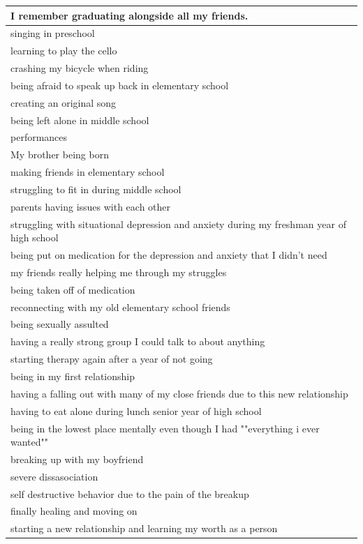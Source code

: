\documentclass[
  .7em,
  letterpaper,
  DIV=11,
  numbers=noendperiod]{scrartcl}
\begin{document}
\begin{table}
\begin{tabular}{l}
\hline
I remember graduating alongside all my friends.\\
\hline
singing in preschool\\
\hline
learning to play the cello\\
\hline
crashing my bicycle when riding\\
\hline
being afraid to speak up back in elementary school\\
\hline
creating an original song\\
\hline
being left alone in middle school\\
\hline
performances\\
\hline
My brother being born\\
\hline
making friends in elementary school\\
\hline
struggling to fit in during middle school\\
\hline
parents having issues with each other\\
\hline
struggling with situational depression and anxiety during my freshman year of high school\\
\hline
being put on medication for the depression and anxiety that I didn't need\\
\hline
my friends really helping me through my struggles\\
\hline
being taken off of medication\\
\hline
reconnecting with my old elementary school friends\\
\hline
being sexually assulted\\
\hline
having a really strong group I could talk to about anything\\
\hline
starting therapy again after a year of not going\\
\hline
being in my first relationship\\
\hline
having a falling out with many of my close friends due to this new relationship\\
\hline
having to eat alone during lunch senior year of high school\\
\hline
being in the lowest place mentally even though I had ""everything i ever wanted""\\
\hline
breaking up with my boyfriend\\
\hline
severe dissasociation\\
\hline
self destructive behavior due to the pain of the breakup\\
\hline
finally healing and moving on\\
\hline
starting a new relationship and learning my worth as a person\\

\end{tabular}
\end{table}
\end{document}
